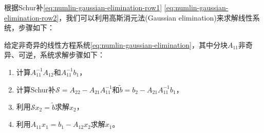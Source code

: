 \begin{subappendices}
根据Schur补\eqref{eq:numlin-gaussian-elimination-row1} \eqref{eq:numlin-gaussian-elimination-row2}，我们可以利用高斯消元法(Gaussian elimination)来求解线性系统，步骤如下：
\begin{algorithm}[高斯消元法求解线性系统]
  \label{algorithm:numlin-gaussian-elimination}
  给定非奇异的线性方程系统\eqref{eq:numlin-gaussian-elimination}，其中分块$A_{11}$非奇异、可逆，系统求解步骤如下：
  \begin{enumerate}
    \item 计算$A_{11}^{-1} A_{12}$和$A_{11}^{-1} b_{1}$，
    \item 计算Schur补$\mathcal{S} = A_{22} - A_{21}A_{11}^{-1}$和$\tilde{b} = b_{2} - A_{21} A_{11}^{-1} b_{1}$，
    \item 利用$\mathcal{S} x_{2} = \tilde{b}$求解$x_{2}$，
    \item 利用$A_{11} x_{1} = b_{1} - A_{12} x_{2}$求解$x_{1}$。
  \end{enumerate}
\end{algorithm}


\end{subappendices}

